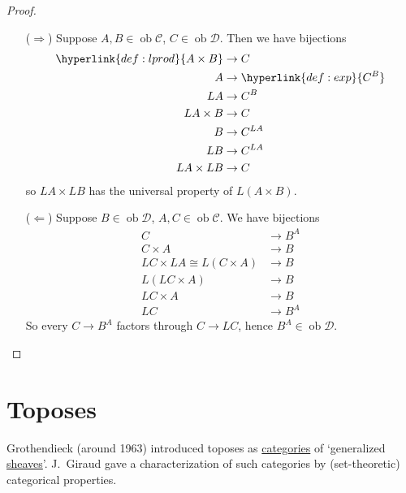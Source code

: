 \documentclass{article}
\DeclareMathOperator{\ob}{ob}
\begin{document}
\begin{proof}\leavevmode
  \begin{itemize}
    \item[($\Rightarrow$)] Suppose $A,B \in \ob \mathscr{C}$, $C \in \ob \mathscr{D}$.
      Then we have bijections
      \begin{align*}
        \hyperlink{def:lprod}{A \times B} &\to C  \\
        A &\to \hyperlink{def:exp}{C^B} \\
        LA &\to C^B \\
        LA \times B &\to C \\
        B &\to C^{LA} \\
        LB &\to C^{LA} \\
        LA \times LB &\to C
      \end{align*}
      so $LA \times LB$ has the universal property of $L(A \times B)$.
    \item [($\Leftarrow$)] Suppose $B \in \ob \mathscr{D}$, $A,C \in \ob \mathscr{C}$. We have bijections
      \begin{align*}
        C &\to B^A \\
        C \times A &\to B \\
        LC \times LA \cong L(C \times A) &\to B \\
        L(LC \times A) &\to B \\
        LC \times A &\to B \\
        LC &\to B^A
      \end{align*}
      So every $C \to B^A$ factors through $C \to LC$, hence $B^A \in \ob \mathscr{D}$. \qedhere
  \end{itemize}
\end{proof}

\clearpage
\section{Toposes}
Grothendieck (around 1963) introduced toposes as \hyperlink{def:cat}{categories} of `generalized \hyperlink{def:presheaf}{sheaves}'.
J.\ Giraud gave a characterization of such categories by (set-theoretic) categorical properties.
\end{document}
